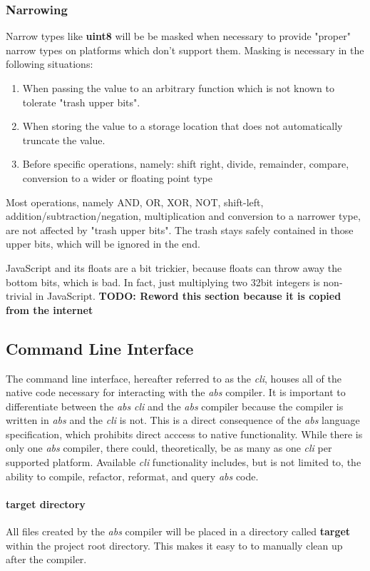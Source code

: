 \documentclass[hidelinks]{article}
\begin{document}
\newpage
\subsubsection{Narrowing}
Narrow types like \textbf{uint8} will be be masked when necessary to provide "proper" narrow types on platforms which don't support them. Masking is necessary in the following situations:
\begin{enumerate}
\item When passing the value to an arbitrary function which is not known to tolerate "trash upper bits".
\item When storing the value to a storage location that does not automatically truncate the value.
\item Before specific operations, namely: shift right, divide, remainder, compare, conversion to a wider or floating point type
\end{enumerate}
Most operations, namely AND, OR, XOR, NOT, shift-left, addition/subtraction/negation, multiplication and conversion to a narrower type, are not affected by "trash upper bits". The trash stays safely contained in those upper bits, which will be ignored in the end.

JavaScript and its floats are a bit trickier, because floats can throw away the bottom bits, which is bad. In fact, just multiplying two 32bit integers is non-trivial in JavaScript.
\newline\noindent
\textbf{TODO: Reword this section because it is copied from the internet}
\subsection{Command Line Interface}
The command line interface, hereafter referred to as the \textit{cli}, houses all of the native code necessary for interacting with the \textit{abs} compiler. It is important to differentiate between the \textit{abs} \textit{cli} and the \textit{abs} compiler because the compiler is written in \textit{abs} and the \textit{cli} is not. This is a direct consequence of the \textit{abs} language specification, which prohibits direct acccess to native functionality. While there is only one \textit{abs} compiler, there could, theoretically, be as many as one \textit{cli} per supported platform. Available \textit{cli} functionality includes, but is not limited to, the ability to compile, refactor, reformat, and query \textit{abs} code. 

\paragraph{target directory} All files created by the \textit{abs} compiler will be placed in a directory called \textbf{target} within the project root directory. This makes it easy to to manually clean up after the compiler.
\end{document}
